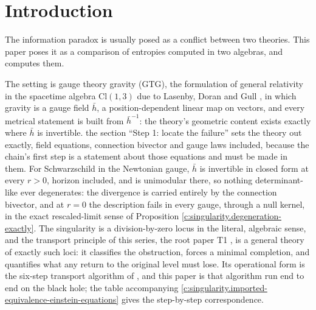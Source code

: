 \documentclass[11pt]{article}
\theoremstyle{definition}
\theoremstyle{plain}
\providecommand{\Cl}{}\renewcommand{\Cl}{\mathrm{Cl}}
\providecommand{\hb}{}\renewcommand{\hb}{\bar{h}}
\begin{document}
\noindent{}
\newpage

\section{Introduction}

\label{c:note.singularity.setting-introduction}
The information paradox is usually posed as a conflict between two theories. This paper poses it as a comparison of entropies computed in two algebras, and computes them.

The setting is gauge theory gravity (GTG), the formulation of general relativity in the spacetime algebra $\Cl(1,3)$ due to Lasenby, Doran and Gull \cite{LDG1998}, in which gravity is a gauge field $\hb$, a position-dependent linear map on vectors, and every metrical statement is built from $\hb^{-1}$: the theory's geometric content exists exactly where $\hb$ is invertible. the section ``Step 1: locate the failure'' sets the theory out exactly, field equations, connection bivector and gauge laws included, because the chain's first step is a statement about those equations and must be made in them. For Schwarzschild in the Newtonian gauge, $\hb$ is invertible in closed form at every $r > 0$, horizon included, and is unimodular there, so nothing determinant-like ever degenerates: the divergence is carried entirely by the connection bivector, and at $r = 0$ the description fails in every gauge, through a null kernel, in the exact rescaled-limit sense of Proposition \ref{c:singularity.degeneration-exactly}. The singularity is a division-by-zero locus in the literal, algebraic sense, and the transport principle of this series, the root paper T1 \cite{ButlerT1}, is a general theory of exactly such loci: it classifies the obstruction, forces a minimal completion, and quantifies what any return to the original level must lose. Its operational form is the six-step transport algorithm of \cite[\S 8.1, Table 1]{ButlerT1}, and this paper is that algorithm run end to end on the black hole; the table accompanying \ref{c:singularity.imported-equivalence-einstein-equations} gives the step-by-step correspondence.
\end{document}
